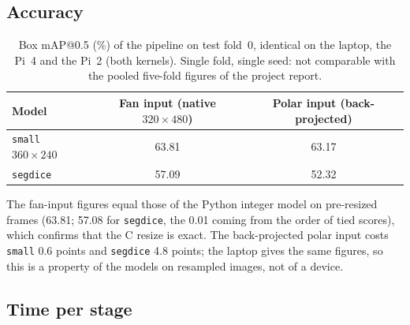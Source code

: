 \documentclass[11pt,a4paper]{article}
\newcommand{\cfg}[1]{\texttt{#1}}
\begin{document}
\subsection{Accuracy}

\begin{table}[H]
\centering
\caption{Box mAP@0.5 (\%) of the pipeline on test fold~0, identical on the
laptop, the Pi~4 and the Pi~2 (both kernels). Single fold, single seed:
not comparable with the pooled five-fold figures of the project report.}
\label{tab:e2emap}
\begin{tabular}{lcc}
\toprule
Model & Fan input (native $320 \times 480$) & Polar input (back-projected) \\
\midrule
\cfg{small} $360{\times}240$ & 63.81 & 63.17 \\
\cfg{segdice} & 57.09 & 52.32 \\
\bottomrule
\end{tabular}
\end{table}

The fan-input figures equal those of the Python integer model on
pre-resized frames (63.81; 57.08 for \cfg{segdice}, the 0.01 coming from
the order of tied scores), which confirms that the C resize is exact.
The back-projected polar input costs \cfg{small} 0.6 points and
\cfg{segdice} 4.8 points; the laptop gives the same figures, so this is a
property of the models on resampled images, not of a device.

\subsection{Time per stage}
\end{document}
